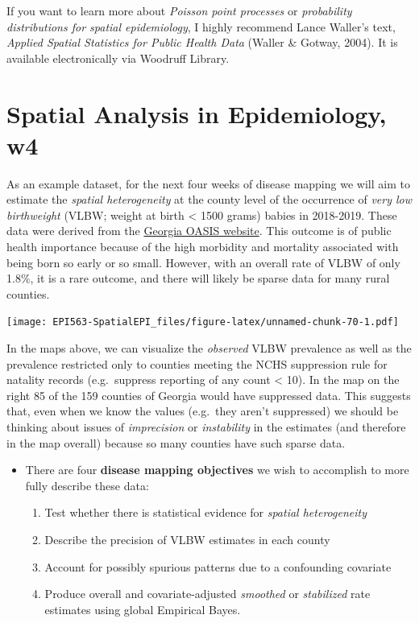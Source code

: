 \documentclass[
]{book}
\providecommand{\tightlist}{%
  \setlength{\itemsep}{0pt}\setlength{\parskip}{0pt}}
\newenvironment{rmdblock}[1]
  {%
  \begin{itemize}
  \renewcommand{\labelitemi}{
    \raisebox{-.7\height}[0pt][0pt]{
      {\setkeys{Gin}{width=3em,keepaspectratio}\texttt{[image: images/\#1]}}
    }
  }
  \item
  }
  {
  \end{itemize}
  }
\newenvironment{rmdnote}
  {\begin{rmdblock}{note}}
  {\end{rmdblock}}
\begin{document}
If you want to learn more about \emph{Poisson point processes} or \emph{probability distributions for spatial epidemiology}, I highly recommend Lance Waller's text, \emph{Applied Spatial Statistics for Public Health Data} (Waller \& Gotway, 2004). It is available electronically via Woodruff Library.

\hypertarget{spatial-analysis-in-epidemiology-w4}{%
\section{Spatial Analysis in Epidemiology, w4}\label{spatial-analysis-in-epidemiology-w4}}

As an example dataset, for the next four weeks of disease mapping we will aim to estimate the \emph{spatial heterogeneity} at the county level of the occurrence of \emph{very low birthweight} (VLBW; weight at birth \textless{} 1500 grams) babies in 2018-2019. These data were derived from the \href{https://oasis.state.ga.us/}{Georgia OASIS website}. This outcome is of public health importance because of the high morbidity and mortality associated with being born so early or so small. However, with an overall rate of VLBW of only 1.8\%, it is a rare outcome, and there will likely be sparse data for many rural counties.

\texttt{[image: EPI563-SpatialEPI\_files/figure-latex/unnamed-chunk-70-1.pdf]}

In the maps above, we can visualize the \emph{observed} VLBW prevalence as well as the prevalence restricted only to counties meeting the NCHS suppression rule for natality records (e.g.~suppress reporting of any count \textless{} 10). In the map on the right 85 of the 159 counties of Georgia would have suppressed data. This suggests that, even when we know the values (e.g.~they aren't suppressed) we should be thinking about issues of \emph{imprecision} or \emph{instability} in the estimates (and therefore in the map overall) because so many counties have such sparse data.

\begin{rmdnote}
There are four \textbf{disease mapping objectives} we wish to accomplish to more fully describe these data:

\begin{enumerate}
\def\labelenumi{\arabic{enumi}.}
\tightlist
\item
  Test whether there is statistical evidence for \emph{spatial heterogeneity}
\item
  Describe the precision of VLBW estimates in each county
\item
  Account for possibly spurious patterns due to a confounding covariate
\item
  Produce overall and covariate-adjusted \emph{smoothed} or \emph{stabilized} rate estimates using global Empirical Bayes.
\end{enumerate}
\end{rmdnote}
\end{document}
